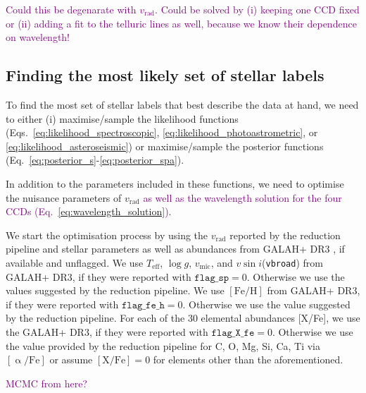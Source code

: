 \documentclass[
  journal=pasa,
  manuscript=research-paper, %
  year=2021,
  volume=37,
]{cup-journal}
\newcommand{\SB}[1]{{\textcolor{purple}{#1}}}
\newcommand{\Teff}{$T_\mathrm{eff}$\xspace}
\newcommand{\logg}{$\log g$\xspace}
\newcommand{\feh}{$\mathrm{[Fe/H]}$\xspace}
\newcommand{\vmic}{$v_\mathrm{mic}$\xspace}
\newcommand{\vsini}{$v \sin i$\xspace}
\newcommand{\vrad}{$v_\mathrm{rad}$\xspace}
\begin{document}
\SB{Could this be degenarate with \vrad. Could be solved by (i) keeping one CCD fixed or (ii) adding a fit to the telluric lines as well, because we know their dependence on wavelength!}

\subsection{Finding the most likely set of stellar labels} \label{subsec:finding_best_labels}

To find the most set of stellar labels that best describe the data at hand, we need to either (i) maximise/sample the likelihood functions
(Eqs.~\ref{eq:likelihood_spectroscopic}, \ref{eq:likelihood_photoastrometric}, or \ref{eq:likelihood_asteroseismic}) or maximise/sample the posterior functions (Eq.~\ref{eq:posterior_s}-\ref{eq:posterior_spa}).

In addition to the parameters included in these functions, we need to optimise the nuisance parameters of \vrad\SB{ as well as the wavelength solution for the four CCDs (Eq.~\ref{eq:wavelength_solution})}.

We start the optimisation process by using the \vrad reported by the reduction pipeline and stellar parameters as well as abundances from GALAH+ DR3 \citep{Buder2021}, if available and unflagged. We use \Teff, \logg, \vmic, and \vsini (\texttt{vbroad}) from GALAH+ DR3, if they were reported with $\texttt{flag\_sp} = 0$. Otherwise we use the values suggested by the reduction pipeline. We use \feh from GALAH+ DR3, if they were reported with $\texttt{flag\_fe\_h} = 0$. Otherwise we use the value suggested by the reduction pipeline. For each of the 30 elemental abundances [X/Fe], we use the GALAH+ DR3, if they were reported with $\texttt{flag\_X\_fe} = 0$. Otherwise we use the value provided by the reduction pipeline for C, O, Mg, Si, Ca, Ti via $\mathrm{[\upalpha/Fe]}$ or assume $\mathrm{[X/Fe]} = 0$ for elements other than the aforementioned.

\SB{MCMC from here?}
\end{document}
